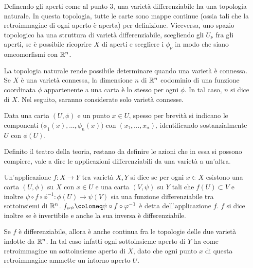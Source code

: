 \begin{remark}
  Definendo gli aperti come al punto 3, una varietà differenziabile ha una topologia naturale. In questa topologia, tutte le carte sono mappe continue (ossia tali che la retroimmagine di ogni aperto è aperta) per definizione. Viceversa, uno spazio topologico ha una struttura di varietà differenziabile, scegliendo gli $U_{\nu}$ fra gli aperti, se è possibile ricoprire $X$ di aperti e scegliere i $\phi_{\nu}$ in modo che siano omeomorfismi con $\mathbb{R}^{n}$.
\end{remark}
\begin{remark}
  La topologia naturale rende possibile determinare quando una varietà è connessa. Se $X$ è una varietà connessa, la dimensione $n$ di $\mathbb{R}^{n}$ codominio di una funzione coordinata $\phi$ appartenente a una carta è lo stesso per ogni $\phi$. In tal caso, $n$ si dice  di $X$. Nel seguito, saranno considerate solo varietà connesse.
\end{remark} 

Data una carta $(U,\phi)$ e un punto $x \in U$, spesso per brevità si indicano le componenti $\big(\phi_1(x), \ldots, \phi_{n}(x)\big)$ con $(x_1, \ldots, x_n)$, identificando sostanzialmente $U$ con $\phi(U)$. 

Definito il teatro della teoria, restano da definire le azioni che in essa si possono compiere, vale a dire le applicazioni differenziabili da una varietà a un'altra.
\begin{definition}
  Un'applicazione $f:X \to Y$ tra varietà $X, Y$ si dice  se per ogni $x \in  X$ esistono una carta $(U, \phi)$ su $X$ con $x \in U$ e una carta $(V, \psi)$ su $Y$ tali che $f(U) \subset V$ e inoltre $\psi \circ f \circ \phi^{-1}: \phi(U) \to \psi(V)$ sia una funzione differenziabile tra sottoinsiemi di $\mathbb{R}^{n}$. $f_{\phi \psi} \defeq \psi \circ f \circ \phi^{-1}$ è detta  dell'applicazione $f$. $f$ si dice inoltre  se è invertibile e anche la sua inversa è differenziabile. 
\end{definition}
\begin{remark}
  Se $f$ è differenziabile, allora è anche continua fra le topologie delle due varietà indotte da $\mathbb{R}^{n}$. In tal caso infatti ogni sottoinsieme aperto di $Y$ ha come retroimmagine un sottoinsieme aperto di $X$, dato che ogni punto $x$ di questa retroimmagine ammette un intorno aperto $U$.
\end{remark}

